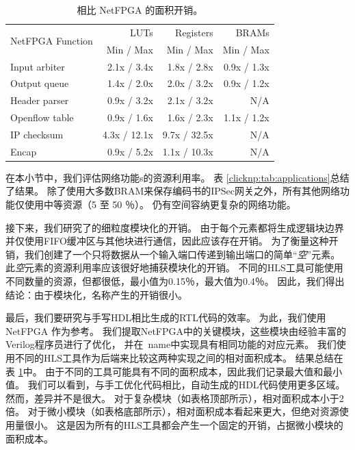\begin{table}[htbp]
	\centering
	
	\caption{相比 NetFPGA 的面积开销。}
	\label{clicknp:tab:netfpga}
	\begin{tabular}{l|r|r|r}
		\toprule
		\multirow{2}{2.2cm}{NetFPGA Function} & LUTs & Registers & BRAMs \\
		& Min / Max & Min / Max & Min / Max \\
		\midrule
		Input arbiter  & 2.1x / 3.4x & 1.8x / 2.8x & 0.9x / 1.3x \\
		Output queue   & 1.4x / 2.0x & 2.0x / 3.2x & 0.9x / 1.2x \\
		Header parser  & 0.9x / 3.2x & 2.1x / 3.2x & N/A \\
		Openflow table & 0.9x / 1.6x & 1.6x / 2.3x & 1.1x / 1.2x \\
		\midrule
		\midrule
		IP checksum    & 4.3x / 12.1x & 9.7x / 32.5x & N/A \\
		Encap          & 0.9x / 5.2x & 1.1x / 10.3x & N/A \\
		\bottomrule
	\end{tabular}
	
\end{table}


在本小节中，我们评估\name 网络功能s的资源利用率。
表 \ref {clicknp:tab:applications}总结了结果。
除了使用大多数BRAM来保存编码书的IPSec网关之外，所有其他网络功能仅使用中等资源（5 至 50 ％）。
仍有空间容纳更复杂的网络功能。

接下来，我们研究了\name 的细粒度模块化的开销。
由于每个元素都将生成逻辑块边界并仅使用FIFO缓冲区与其他块进行通信，因此应该存在开销。
为了衡量这种开销，我们创建了一个只将数据从一个输入端口传递到输出端口的简单``\textit{空}''元素。
此\textit {空}元素的资源利用率应该很好地捕获模块化的开销。
不同的HLS工具可能使用不同数量的资源，但都很低，最小值为0.15％，最大值为0.4％。
因此，我们得出结论：由于模块化，名称产生的开销很小。

最后，我们要研究\name 与手写HDL相比生成的RTL代码的效率。
为此，我们使用NetFPGA \cite {netfpga}作为参考。
我们提取NetFPGA中的关键模块，这些模块由经验丰富的Verilog程序员进行了优化，
并在\ name中实现具有相同功能的对应元素。
我们使用不同的HLS工具作为后端来比较这两种实现之间的相对面积成本。
结果总结在表 \ref {clicknp:tab:netfpga}中。
由于不同的工具可能具有不同的面积成本，因此我们记录最大值和最小值。
我们可以看到，与手工优化代码相比，自动生成的HDL代码使用更多区域。
然而，差异并不是很大。
对于复杂模块（如表格顶部所示），相对面积成本小于2倍。
对于微小模块（如表格底部所示），相对面积成本看起来更大，但绝对资源使用量很小。
这是因为所有的HLS工具都会产生一个固定的开销，占据微小模块的面积成本。


